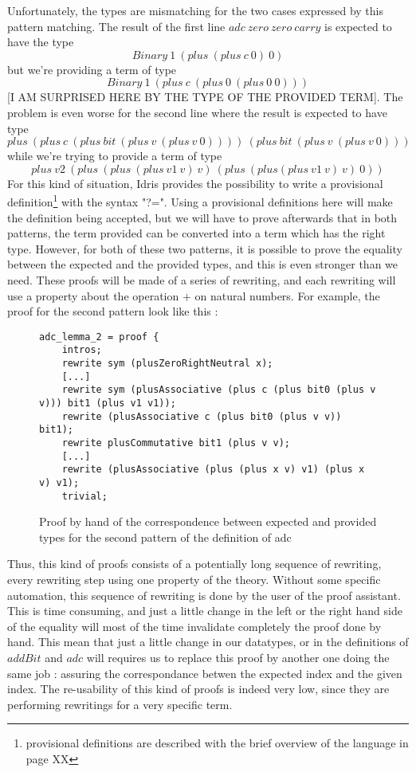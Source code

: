Unfortunately, the types are mismatching for the two cases expressed by this pattern matching. The result of the first line $adc\ zero\ zero\ carry$ is expected to have the type\[Binary\ 1\ (plus\ (plus\ c\ 0)\ 0)\] but we're providing a term of type \[Binary\ 1\ (plus\ c\ (plus\ 0\ (plus\ 0\ 0)))\] [I AM SURPRISED HERE BY THE TYPE OF THE PROVIDED TERM].
The problem is even worse for the second line where the result is expected to have type \[plus\ (plus\ c\ (plus\ bit\ (plus\ v\ (plus\ v\ 0))))\ (plus\ bit\ (plus\ v\ (plus\ v\ 0)))\] while we're trying to provide a term of type \[plus\ v2\ (plus\ (plus\ (plus\ v1\ v)\ v)\ (plus\ (plus (plus\ v1\ v)\ v)\ 0))\]
For this kind of situation, Idris provides the possibility to write a provisional definition\footnote{provisional definitions are described with the brief overview of the language in page XX} with the syntax "?=". Using a provisional definitions here will make the definition being accepted, but we will have to prove afterwards that in both patterns, the term provided can be converted into a term which has the right type.
However, for both of these two patterns, it is possible to prove the equality between the expected and the provided types, and this is even stronger than we need. These proofs will be made of a series of rewriting, and each rewriting will use a property about the operation $+$ on natural numbers.
For example, the proof for the second pattern look like this :
\begin{figure}[H]
\figrule
\begin{center}
\begin{verbatim}
adc_lemma_2 = proof {
    intros;
    rewrite sym (plusZeroRightNeutral x);
    [...]
    rewrite sym (plusAssociative (plus c (plus bit0 (plus v v))) bit1 (plus v1 v1));
    rewrite (plusAssociative c (plus bit0 (plus v v)) bit1);
    rewrite plusCommutative bit1 (plus v v);
    [...]
    rewrite (plusAssociative (plus (plus x v) v1) (plus x v) v1);
    trivial;
\end{verbatim}
\end{center}
\caption{Proof by hand of the correspondence between expected and provided types for the second pattern of the definition of adc}
\figrule
\end{figure}


Thus, this kind of proofs consists of a potentially long sequence of rewriting, every rewriting step using one property of the theory. Without some specific automation, this sequence of rewriting is done by the user of the proof assistant. This is time consuming, and just a little change in the left or the right hand side of the equality will most of the time invalidate completely the proof done by hand. This mean that just a little change in our datatypes, or in the definitions of $addBit$ and $adc$ will requires us to replace this proof by another one doing the same job : assuring the correspondance betwen the expected index and the given index. The re-usability of this kind of proofs is indeed very low, since they are performing rewritings for a very specific term.

